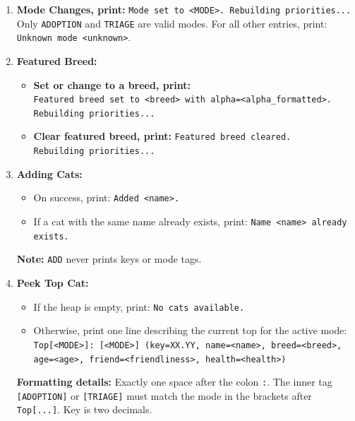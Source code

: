 \documentclass[11pt]{article}
\begin{document}
\begin{enumerate}
    \item \textbf{Mode Changes, print:} \texttt{Mode set to <MODE>. Rebuilding priorities...} \\
    Only \texttt{ADOPTION} and \texttt{TRIAGE} are valid modes. For all other entries, print: \\ \texttt{Unknown mode <unknown>}.
    
    \item \textbf{Featured Breed:}
    \begin{itemize}
        \item \textbf{Set or change to a breed, print:} \\ \texttt{Featured breed set to <breed> with alpha=<alpha\_formatted>.} \\ \texttt{Rebuilding priorities...}
        \item \textbf{Clear featured breed, print:} \texttt{Featured breed cleared.} \\ \texttt{Rebuilding priorities...}
    \end{itemize}

    \item \textbf{Adding Cats:}
    \begin{itemize}
        \item On success, print: \texttt{Added <name>.}
        \item If a cat with the same name already exists, print: \texttt{Name <name> already exists.}
    \end{itemize}
    \textbf{Note:} \texttt{ADD} never prints keys or mode tags.

    \item \textbf{Peek Top Cat:}
    \begin{itemize}
        \item If the heap is empty, print: \texttt{No cats available.}
        \item Otherwise, print one line describing the current top for the active mode: \\
        \texttt{Top[<MODE>]: [<MODE>] (key=XX.YY, name=<name>, breed=<breed>,} \\ \texttt{age=<age>, friend=<friendliness>, health=<health>)}
    \end{itemize}
    \textbf{Formatting details:} Exactly one space after the colon \texttt{:}. The inner tag \texttt{[ADOPTION]} or \texttt{[TRIAGE]} must match the mode in the brackets after \texttt{Top[...]}. Key is two decimals.


\end{enumerate}
\end{document}
